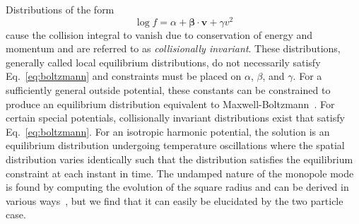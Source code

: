 \documentclass[%
 reprint,
 amsmath,amssymb,
 aps,
]{revtex4-1}
\begin{document}
Distributions of the form
\begin{equation}
\log f = \alpha + \mathbf{\beta}\cdot\mathbf{v}+\gamma v^2
\label{eq:collisioninvariant}
\end{equation}
cause the collision integral to vanish due to conservation of energy and momentum and are referred to as \textit{collisionally invariant}.
These distributions, generally called local equilibrium distributions, do not necessarily satisfy Eq.~\ref{eq:boltzmann} and constraints must be placed on $\alpha$, $\beta$, and $\gamma$.
For a sufficiently general outside potential, these constants can be constrained to produce an equilibrium distribution equivalent to Maxwell-Boltzmann~\cite{UhlenbeckFord}.
For certain special potentials, collisionally invariant distributions exist that satisfy Eq.~\ref{eq:boltzmann}.
For an isotropic harmonic potential, the solution is an equilibrium distribution undergoing temperature oscillations where the spatial distribution varies identically such that the distribution satisfies the equilibrium constraint at each instant in time.
The undamped nature of the monopole mode is found by computing the evolution of the square radius and can be derived in various ways~\cite{Guery-Odelin1999}, but we find that it can easily be elucidated by the two particle case.


\end{document}
